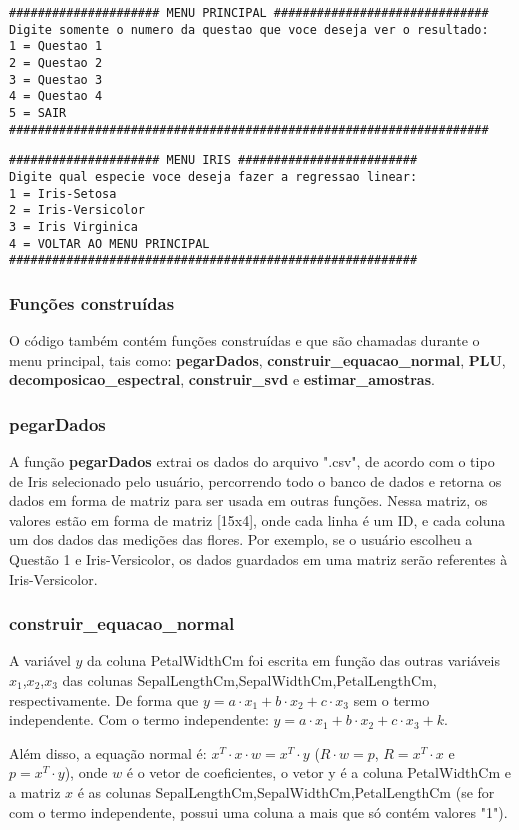 \documentclass[a4paper,12pt,twoside]{article}
\begin{document}
\begin{lstlisting}
##################### MENU PRINCIPAL ##############################
Digite somente o numero da questao que voce deseja ver o resultado: 
1 = Questao 1
2 = Questao 2
3 = Questao 3
4 = Questao 4
5 = SAIR
###################################################################
\end{lstlisting}

\begin{lstlisting}
##################### MENU IRIS #########################
Digite qual especie voce deseja fazer a regressao linear: 
1 = Iris-Setosa
2 = Iris-Versicolor
3 = Iris Virginica
4 = VOLTAR AO MENU PRINCIPAL
#########################################################
\end{lstlisting}

\subsubsection{Funções construídas}
O código também contém funções construídas e que são chamadas durante o menu principal, tais como: \textbf{pegarDados}, \textbf{construir\_equacao\_normal}, \textbf{PLU}, \textbf{decomposicao\_espectral}, \textbf{construir\_svd} e \textbf{estimar\_amostras}.
\subsubsection{pegarDados}
   A função \textbf{pegarDados} extrai os dados do arquivo ".csv", de acordo com o tipo de Iris selecionado pelo usuário, percorrendo todo o banco de dados e retorna os dados em forma de matriz para ser usada em outras funções. Nessa matriz, os valores estão em forma de matriz [15x4], onde cada linha é um ID, e cada coluna um dos dados das medições das flores. Por exemplo, se o usuário escolheu a Questão 1 e Iris-Versicolor, os dados guardados em uma matriz serão referentes à Iris-Versicolor.
\subsubsection{construir\_equacao\_normal}
A variável $y$ da coluna PetalWidthCm foi escrita em função das outras variáveis $x_{1}$,$x_{2}$,$x_{3}$ das colunas SepalLengthCm,SepalWidthCm,PetalLengthCm, respectivamente. De forma que 
$y= a\cdot x_{1} +b\cdot x_{2}+c\cdot x_{3}$ sem o termo independente. Com o termo independente: $y= a\cdot x_{1} +b\cdot x_{2}+c\cdot x_{3} +k$.

    Além disso, a equação normal é: $x^{T}\cdot x\cdot w=x^{T}\cdot y$ ($R\cdot w=p$, $R=x^{T}\cdot x$ e $p = x^{T}\cdot y$), onde $w$ é o vetor de coeficientes, o vetor y é a coluna PetalWidthCm e a matriz $x$ é as colunas SepalLengthCm,SepalWidthCm,PetalLengthCm (se for com o termo independente, possui uma coluna a mais que só contém valores "1").
    
\end{document}

